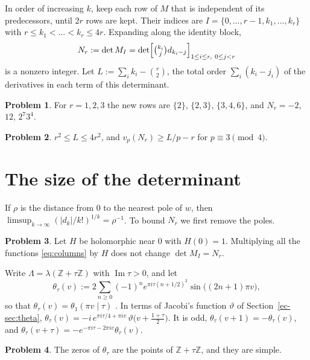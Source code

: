 \documentclass[reqno]{amsart}
\theoremstyle{definition}
\newtheorem{problem}{Problem}[section]
\theoremstyle{plain}
\newcommand{\Z}{\mathbb{Z}}
\begin{document}
In order of increasing \(k\), keep each row of \(M\) that is independent of its predecessors, until \(2r\) rows are kept.  Their indices are \(I = \{0, \dots, r-1, k_1, \dots, k_r\}\) with \(r \le k_1 < \dots < k_r \le 4r\).  Expanding along the identity block,
\[
  N_r := \det M_I = \det\Bigl[\tbinom{k_i}{j} d_{k_i - j}\Bigr]_{1 \le i \le r,\ 0 \le j < r}
\]
is a nonzero integer.  Let \(L := \sum_i k_i - \binom r2\), the total order \(\sum_i (k_i - j_i)\) of the derivatives in each term of this determinant.

\begin{problem}\label{pr:Nr-small}
For \(r = 1, 2, 3\) the new rows are \(\{2\}\), \(\{2, 3\}\), \(\{3, 4, 6\}\), and \(N_r = -2\), \(12\), \(2^7 3^4\).
\end{problem}

\begin{problem}\label{pr:Nr-div}
\(r^2 \le L \le 4r^2\), and \(v_p(N_r) \ge L/p - r\) for \(p \equiv 3 \pmod 4\).
\end{problem}

\section{The size of the determinant}\label{sec:size}

If \(\rho\) is the distance from \(0\) to the nearest pole of \(w\), then \(\limsup_{k\to\infty} (\lvert d_k\rvert/k!)^{1/k} = \rho^{-1}\).  To bound \(N_r\) we first remove the poles.

\begin{problem}\label{pr:triangular}
Let \(H\) be holomorphic near \(0\) with \(H(0) = 1\).  Multiplying all the functions \eqref{eq:columns} by \(H\) does not change \(\det M_I = N_r\).
\end{problem}

Write \(\Lambda = \lambda(\Z + \tau\Z)\) with \(\operatorname{Im}\tau > 0\), and let
\[
  \theta_\tau(v) := 2\sum_{n \ge 0} (-1)^n e^{\pi i\tau(n + 1/2)^2} \sin\bigl((2n + 1)\pi v\bigr),
\]
so that \(\theta_\tau(v) = \theta_1(\pi v \mid \tau)\) \cite[(20.2.1)]{DLMF}.  In terms of Jacobi's function \(\vartheta\) of Section~\ref{ec-sec:theta}, \(\theta_\tau(v) = -i\, e^{\pi i\tau/4 + \pi i v}\, \vartheta\bigl(v + \tfrac{1+\tau}{2}\bigr)\).  It is odd, \(\theta_\tau(v + 1) = -\theta_\tau(v)\), and \(\theta_\tau(v + \tau) = -e^{-\pi i\tau - 2\pi i v}\theta_\tau(v)\).

\begin{problem}\label{pr:theta-zeros}
The zeros of \(\theta_\tau\) are the points of \(\Z + \tau\Z\), and they are simple.
\end{problem}
\end{document}
